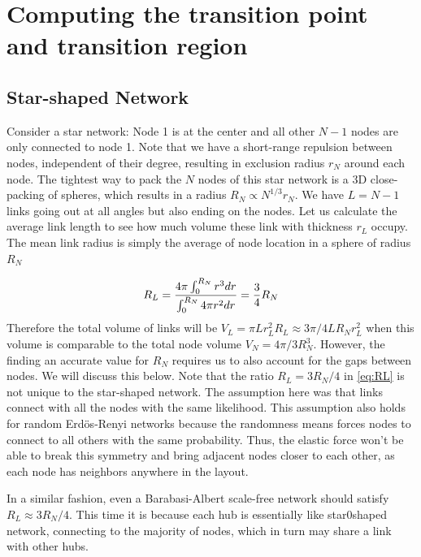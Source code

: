 \documentclass[endfloats,nofootinbib,preprint,floatfix,titlepage,superscriptaddress,linenumbers]{revtex4-1} %
\begin{document}
{\section{Computing the transition point and transition region \label{ap:phase-trans}}
\subsection{Star-shaped Network}
Consider a star network: 
Node 1 is at the center and all other $N-1$ nodes are only connected to node 1. 
Note that we have a short-range repulsion between nodes, independent of their degree, resulting in exclusion radius $r_N$ around each node. 
The tightest way to pack the $N$ nodes of this star network is a 3D close-packing of spheres, which results in a radius $R_N\propto N^{1/3}r_N$.
We have $L=N-1$ links going out at all angles but also ending on the nodes.
Let us calculate the average link length to see how much volume these link with thickness $r_L$ occupy. 
The mean link radius is simply the average of node location in a sphere of radius $R_N$ 

\begin{align}
    R_L =  \frac{4\pi \int_0^{R_N} r^3dr }{\int_0^{R_N} 4\pi r^2 dr} = {3\over 4} R_N
    \label{eq:RL}
\end{align}
Therefore the total volume of links will be $V_L = \pi L r_L^2 R_L \approx 3\pi/4 L R_N r_L^2 $ when this volume is comparable to the total node volume $V_N = 4\pi/3 R_N^3$. %
%
%
However, the finding an accurate value for $R_N$ requires us to also account for the gaps between nodes. 
We will discuss this below. 
Note that the ratio $R_L= 3R_N/4$ in \eqref{eq:RL} is not unique to the star-shaped network. 
The assumption here was that links connect with all the nodes with the same likelihood. 
This assumption also holds for random Erd\"os-Renyi networks because the randomness means forces nodes to connect to all others with the same probability.
Thus, the elastic force won't be able to break this symmetry and bring adjacent nodes closer to each other, as each node has neighbors anywhere in the layout.

In a similar fashion, even a Barabasi-Albert scale-free network should satisfy $R_L\approx  3R_N/4$. 
This time it is because each hub is essentially like star0shaped network, connecting to the majority of nodes, which in turn may share a link with other hubs.  

}
\end{document}
